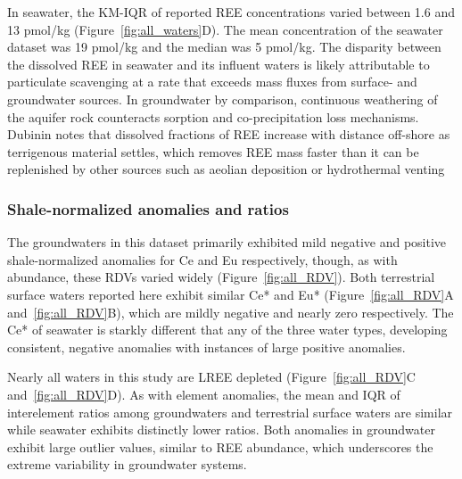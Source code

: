In seawater, the KM-IQR of reported REE concentrations varied between 1.6 and 13 pmol/kg (Figure~\ref{fig:all_waters}D).
The mean concentration of the seawater dataset was 19 pmol/kg and the median was 5 pmol/kg.
The disparity between the dissolved REE in seawater and its influent waters is likely attributable to particulate scavenging \citep{Sholkovitz_GCA_1994, Erel_GCA_1993} at a rate that exceeds mass fluxes from surface- and groundwater sources.
In groundwater by comparison, continuous weathering of the aquifer rock counteracts sorption and co-precipitation loss mechanisms.
Dubinin \citep{Dubinin_LMR_2004} notes that dissolved fractions of REE increase with distance off-shore as terrigenous material settles, which removes REE mass faster than it can be replenished by other sources such as aeolian deposition or hydrothermal venting

\subsubsection{Shale-normalized anomalies and ratios}

The groundwaters in this dataset primarily exhibited mild negative and positive shale-normalized anomalies for Ce and Eu respectively, though, as with abundance, these RDVs varied widely (Figure~\ref{fig:all_RDV}).
Both terrestrial surface waters reported here exhibit similar Ce* and Eu* (Figure~\ref{fig:all_RDV}A and~\ref{fig:all_RDV}B), which are mildly negative and nearly zero respectively.
The Ce* of seawater is starkly different that any of the three water types, developing consistent, negative anomalies with instances of large positive anomalies. 

Nearly all waters in this study are LREE depleted (Figure~\ref{fig:all_RDV}C and~\ref{fig:all_RDV}D).
As with element anomalies, the mean and IQR of interelement ratios among groundwaters and terrestrial surface waters are similar while seawater exhibits distinctly lower ratios.
Both anomalies in groundwater exhibit large outlier values, similar to REE abundance, which underscores the extreme variability in groundwater systems.

